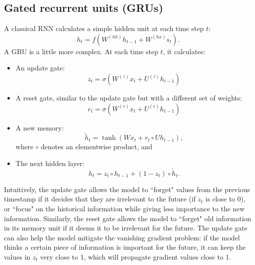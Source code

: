 \subsection{Gated recurrent units (GRUs)}
A classical RNN calculates a simple hidden unit at each time step $t$:
$$h_t = f\left(W^{(hh)}h_{t-1} + W^{(hx)}s_t\right).$$
A GRU is a little more complex. At each time step $t$, it calculates:
\begin{itemize}
\item An update gate:
$$z_t = \sigma\left(W^{(z)}x_t + U^{(z)}h_{t-1}\right)$$
\item A reset gate, similar to the update gate but with a different set of weights:
$$r_t = \sigma\left(W^{(r)}x_t + U^{(r)}h_{t-1}\right)$$
\item A new memory:
$$\tilde{h}_t = \tanh\left(Wx_t + r_t \circ Uh_{t-1}\right),$$
where $\circ$ denotes an elementwise product, and
\item The next hidden layer:
$$h_t = z_t \circ h_{t-1} + (1 - z_t) \circ \tilde{h}_t.$$
\end{itemize}
Intuitively, the update gate allows the model to ``forget" values from the previous timestamp if it decides that they are irrelevant to the future (if $z_t$ is close to 0), or ``focus" on the historical information while giving less importance to the new information. Similarly, the reset gate allows the model to ``forget" old information in its memory unit if it deems it to be irrelevant for the future. The update gate can also help the model mitigate the vanishing gradient problem: if the model thinks a certain piece of information is important for the future, it can keep the values in $z_t$ very close to 1, which will propagate gradient values close to 1.

